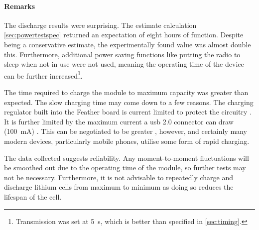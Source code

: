 \paragraph{Remarks}
The discharge results were surprising. The estimate calculation
\cref{sec:powertestspec} returned an expectation of eight hours of function.
Despite being a conservative estimate, the experimentally found value was
almost double this. Furthermore, additional power saving functions like
putting the radio to sleep when not in use were not used, meaning the operating
time of the device can be further increased\footnote{
    Transmission was set at \qty{5}{\s}, which is better than specified in \cref{sec:timing}.
}. 

The time required to charge the module to maximum capacity was
greater than expected. The slow charging time may come down to
a few reasons. The charging regulator built into
the Feather board is current limited to protect the circuitry \cite{adafruit:loram0}.
It is further limited by the maximum current a \acrshort{usb} 2.0 connector can draw
(\qty{100}{\mA}) \cite{axelson:usb}. This can be negotiated to be greater \cite{ftdi:usb}, however,
and certainly many modern devices, particularly mobile phones, utilise some form of rapid charging.

The data collected suggests reliability. Any moment-to-moment fluctuations will be smoothed out
due to the operating time of the module, so further tests
may not be necessary. Furthermore, it is not advisable to repeatedly charge
and discharge lithium cells from maximum to minimum as doing so reduces the lifespan of the cell.

